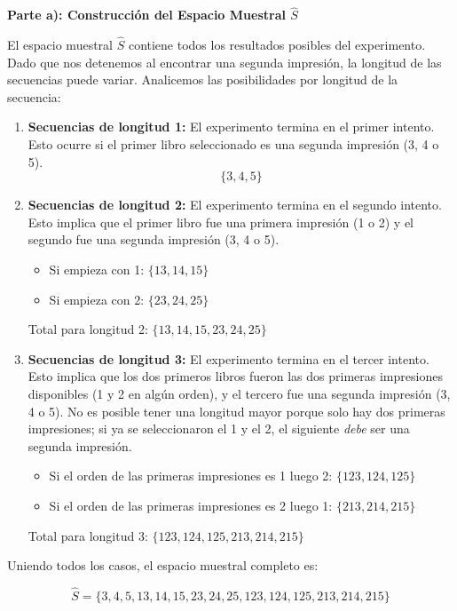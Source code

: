 \documentclass[a4paper]{article}
\begin{document}
\vspace{0.3cm}

\textbf{Parte a): Construcción del Espacio Muestral $\hat{S}$}

El espacio muestral $\hat{S}$ contiene todos los resultados posibles del experimento. Dado que nos detenemos al encontrar una segunda impresión, la longitud de las secuencias puede variar. Analicemos las posibilidades por longitud de la secuencia:

\begin{enumerate}
    \item \textbf{Secuencias de longitud 1:} El experimento termina en el primer intento. Esto ocurre si el primer libro seleccionado es una segunda impresión (3, 4 o 5).
    $$ \{3, 4, 5\} $$

    \item \textbf{Secuencias de longitud 2:} El experimento termina en el segundo intento. Esto implica que el primer libro fue una primera impresión (1 o 2) y el segundo fue una segunda impresión (3, 4 o 5).
    \begin{itemize}
        \item Si empieza con 1: $\{13, 14, 15\}$
        \item Si empieza con 2: $\{23, 24, 25\}$
    \end{itemize}
    Total para longitud 2: $\{13, 14, 15, 23, 24, 25\}$

    \item \textbf{Secuencias de longitud 3:} El experimento termina en el tercer intento. Esto implica que los dos primeros libros fueron las dos primeras impresiones disponibles (1 y 2 en algún orden), y el tercero fue una segunda impresión (3, 4 o 5). No es posible tener una longitud mayor porque solo hay dos primeras impresiones; si ya se seleccionaron el 1 y el 2, el siguiente \textit{debe} ser una segunda impresión.
    \begin{itemize}
        \item Si el orden de las primeras impresiones es 1 luego 2: $\{123, 124, 125\}$
        \item Si el orden de las primeras impresiones es 2 luego 1: $\{213, 214, 215\}$
    \end{itemize}
    Total para longitud 3: $\{123, 124, 125, 213, 214, 215\}$
\end{enumerate}

Uniendo todos los casos, el espacio muestral completo es:

$$ \hat{S} = \{3, 4, 5, 13, 14, 15, 23, 24, 25, 123, 124, 125, 213, 214, 215\} $$
\end{document}
